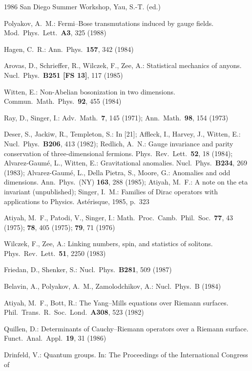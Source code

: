 \documentclass[11pt,a4paper]{article}
\begin{document}
\begin{enumerate}[label={[\arabic*]}, leftmargin=2.4em, labelsep=0.5em, align=left]
          1986 San Diego Summer Workshop, Yau, S.-T. (ed.)
    \item Polyakov, A.~M.: Fermi--Bose transmutations induced by gauge fields.
          Mod.\ Phys.\ Lett.\ \textbf{A3}, 325 (1988)
    \item Hagen, C.~R.: Ann.\ Phys.\ \textbf{157}, 342 (1984)
    \item Arovas, D., Schrieffer, R., Wilczek, F., Zee, A.: Statistical mechanics of anyons.
          Nucl.\ Phys.\ \textbf{B251 [FS 13]}, 117 (1985)
    \item Witten, E.: Non-Abelian bosonization in two dimensions. Commun.\ Math.\ Phys.\
          \textbf{92}, 455 (1984)
    \item Ray, D., Singer, I.: Adv.\ Math.\ \textbf{7}, 145 (1971); Ann.\ Math.\ \textbf{98},
          154 (1973)
    \item Deser, S., Jackiw, R., Templeton, S.: In [21]; Affleck, I., Harvey, J., Witten, E.:
          Nucl.\ Phys.\ \textbf{B206}, 413 (1982); Redlich, A.~N.: Gauge invariance and parity
          conservation of three-dimensional fermions. Phys.\ Rev.\ Lett.\ \textbf{52}, 18 (1984);
          Alvarez-Gaum\'e, L., Witten, E.: Gravitational anomalies. Nucl.\ Phys.\ \textbf{B234},
          269 (1983); Alvarez-Gaum\'e, L., Della Pietra, S., Moore, G.: Anomalies and odd
          dimensions. Ann.\ Phys.\ (NY) \textbf{163}, 288 (1985); Atiyah, M.~F.: A note on the
          eta invariant (unpublished); Singer, I.~M.: Families of Dirac operators with
          applications to Physics. Ast\'erisque, 1985, p.~323
    \item Atiyah, M.~F., Patodi, V., Singer, I.: Math.\ Proc.\ Camb.\ Phil.\ Soc.\ \textbf{77},
          43 (1975); \textbf{78}, 405 (1975); \textbf{79}, 71 (1976)
    \item Wilczek, F., Zee, A.: Linking numbers, spin, and statistics of solitons.
          Phys.\ Rev.\ Lett.\ \textbf{51}, 2250 (1983)
    \item Friedan, D., Shenker, S.: Nucl.\ Phys.\ \textbf{B281}, 509 (1987)
    \item Belavin, A., Polyakov, A.~M., Zamolodchikov, A.: Nucl.\ Phys.\ B (1984)
    \item Atiyah, M.~F., Bott, R.: The Yang--Mills equations over Riemann surfaces.
          Phil.\ Trans.\ R.\ Soc.\ Lond.\ \textbf{A308}, 523 (1982)
    \item Quillen, D.: Determinants of Cauchy--Riemann operators over a Riemann surface.
          Funct.\ Anal.\ Appl.\ \textbf{19}, 31 (1986)
    \item Drinfeld, V.: Quantum groups. In: The Proceedings of the International Congress of

\end{enumerate}
\end{document}
